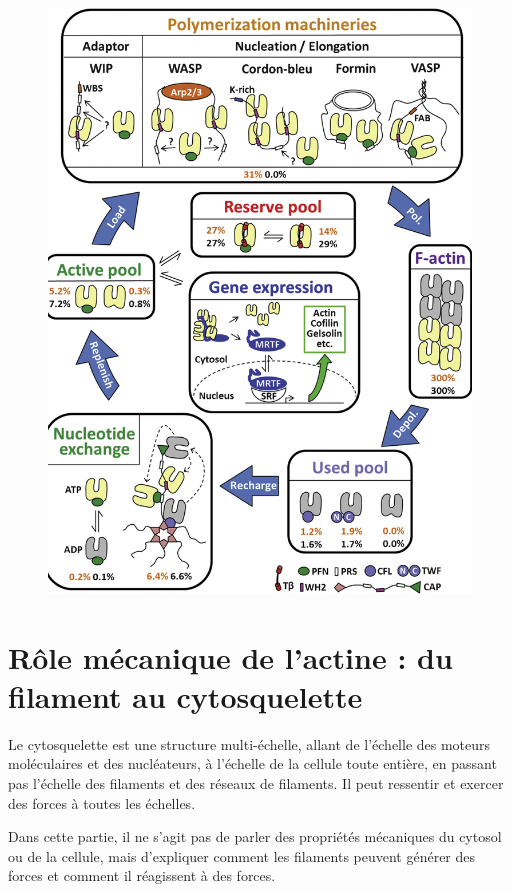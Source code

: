 \begin{figure}
\includegraphics[scale=0.25]{actine_cycle.png}
\end{figure}


\section{Rôle mécanique de l'actine : du filament au cytosquelette}

Le cytosquelette est une structure multi-échelle, allant de l'échelle des moteurs moléculaires et des nucléateurs, à l'échelle de la cellule toute entière, en passant pas l'échelle des filaments et des réseaux de filaments. Il peut ressentir et exercer des forces à toutes les échelles. 


Dans cette partie, il ne s'agit pas de parler des propriétés mécaniques du cytosol ou de la cellule, mais d'expliquer comment les filaments peuvent générer des forces et comment il réagissent à des forces. 

